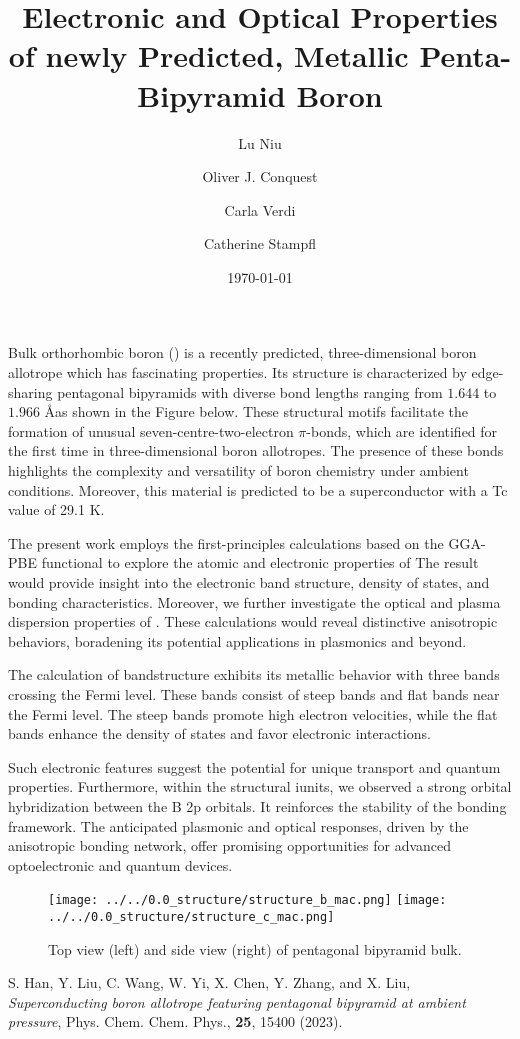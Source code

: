 \documentclass[12pt]{article}
\title{Electronic and Optical Properties of newly Predicted, Metallic Penta-Bipyramid Boron}
\author[1]{Lu Niu}
\author[1]{Oliver J. Conquest}
\author[1,2]{Carla Verdi}
\author[1*]{Catherine Stampfl}
\affil[1]{School of Physics, The University of Sydney, Sydney 2006, NSW, Australia}
\affil[2]{School of Mathematics and Physics, The University of Queensland, Brisbane, Queensland 4072, Australia}
\date{\today}
\begin{document}
\maketitle

\par Bulk orthorhombic boron () is a recently predicted, three-dimensional boron allotrope which has fascinating properties\cite{bulk_boron}. 
Its structure is characterized by edge-sharing pentagonal bipyramids with diverse bond lengths ranging from $1.644$ to $1.966$ \AA as shown in the Figure below.
These structural motifs facilitate the formation of unusual seven-centre-two-electron $\pi$-bonds, which are identified for the first time in three-dimensional boron allotropes.
The presence of these bonds highlights the complexity and versatility of boron chemistry under ambient conditions.
Moreover, this material is predicted to be a superconductor with a Tc value of 29.1 K.

\par The present work employs the first-principles calculations based on the GGA-PBE functional to explore the atomic and electronic properties of 
The result would provide insight into the electronic band structure, density of states, and bonding characteristics.
Moreover, we further investigate the optical and plasma dispersion properties of .
These calculations would reveal distinctive anisotropic behaviors, boradening its potential applications in plasmonics and beyond.

\par The calculation of bandstructure exhibits its metallic behavior with three bands crossing the Fermi level.
These bands consist of steep bands and flat bands near the Fermi level.
The steep bands promote high electron velocities, while the flat bands enhance the density of states and favor electronic interactions.

\par Such electronic features suggest the potential for unique transport and quantum properties.
Furthermore, within the structural iunits, we observed a strong orbital hybridization between the B 2p orbitals.
It reinforces the stability of the bonding framework.
The anticipated plasmonic and optical responses, driven by the anisotropic bonding network, offer promising opportunities for advanced optoelectronic and quantum devices.

\begin{figure}[h!]
    \centering
    \texttt{[image: ../../0.0\_structure/structure\_b\_mac.png]}\hfill
    \texttt{[image: ../../0.0\_structure/structure\_c\_mac.png]}
    \caption{Top view (left) and side view (right) of  pentagonal bipyramid bulk.}
    \label{fig:o-b14_views}
\end{figure}

\begin{thebibliography}{01}
     S. Han, Y. Liu, C. Wang, W. Yi, X. Chen, Y. Zhang, and X. Liu, 
    \textit{Superconducting boron allotrope featuring pentagonal bipyramid at ambient pressure}, Phys. Chem. Chem. Phys., \textbf{25}, 15400 (2023).
\end{thebibliography}
\end{document}

